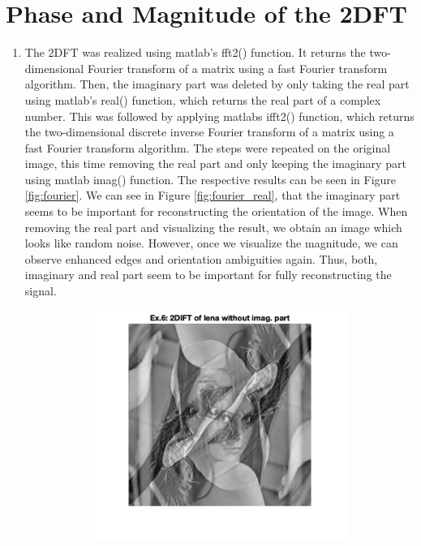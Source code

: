 \documentclass{article}
\begin{document}
\section{Phase and Magnitude of the 2DFT}
\begin{enumerate}
    \item The 2DFT was realized using matlab's fft2() function. It returns the two-dimensional Fourier transform of a matrix using a fast Fourier transform algorithm. Then, the imaginary part was deleted by only taking the real part using matlab's real() function, which returns the real part of a complex number. This was followed by applying matlabs ifft2() function, which returns the two-dimensional discrete inverse Fourier transform of a matrix using a fast Fourier transform algorithm. The steps were repeated on the original image, this time removing the real part and only keeping the imaginary part using matlab imag() function. The respective results can be seen in Figure \ref{fig:fourier}. We can see in Figure \ref{fig:fourier_real}, that the imaginary part seems to be important for reconstructing the orientation of the image. When removing the real part and visualizing the result, we obtain an image which looks like random noise. However, once we visualize the magnitude, we can observe enhanced edges and orientation ambiguities again. Thus, both, imaginary and real part seem to be important for fully reconstructing the signal. 
    \begin{figure}
    \centering
    \begin{subfigure}[c]{0.3\textwidth}
        \includegraphics[width=\textwidth]{images/leana_real.png}

\end{subfigure}
\end{figure}
\end{enumerate}
\end{document}
